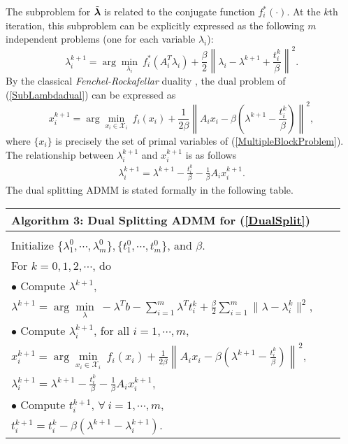 \documentclass{mcom-l}
\theoremstyle{definition}
\theoremstyle{remark}
\numberwithin{equation}{section}
\begin{document}
{The subproblem for $\tilde{{\mbox{\boldmath $\lambda$}}}$ is related to the conjugate function $f_i^*(\cdot)$. At the $k$th iteration, this subproblem can be explicitly expressed as the following $m$ independent problems (one for each variable $\lambda_i$):
\begin{equation}\label{SubLambdadual}
\lambda_i^{k+1} = \arg\min_{\lambda_i}\ f_i^*(A_i^T \lambda_i) +
\frac{\beta}{2}\left\| \lambda_i - \lambda^{k+1} + \frac{t_i^k}{\beta}
\right\|^2.
\end{equation}
By the classical {\em{Fenchel-Rockafellar}} duality \cite{BauschkeCombettes2011,Rockafellar1996},  the dual problem of (\ref{SubLambdadual}) can be expressed as
\begin{equation}\label{SubLambdaprimal}
x_i^{k+1} = \arg\min_{x_i\in {\mathcal{X}}_i}\ f_i(x_i) +
\frac{1}{2\beta}\left\| A_i x_i - \beta (\lambda^{k+1} -
\frac{t_i^k}{\beta}) \right\|^2,
\end{equation}
where $\{x_i\}$ is precisely the set of primal variables of (\ref{MultipleBlockProblem}). The relationship between $\lambda_i^{k+1}$ and $x_i^{k+1}$ is as follows
\begin{align}\label{eqLambda}
\lambda_i^{k+1} = \lambda^{k+1} - \frac{t_i^k}{\beta} - \frac{1}{\beta} A_i x_i^{k+1}.\end{align}
The dual splitting ADMM is stated formally in the following table.
\begin{center}
\begin{tabular}{@{}llr@{}}\toprule
{\bf{\qquad\quad Algorithm 3: Dual Splitting ADMM for (\ref{DualSplit})}}\\
\hline\\
\qquad Initialize $\{\lambda_1^0,\cdots,\lambda_m^0\},\{t_1^0,\cdots,t_m^0\}$, and $\beta$.\\
\qquad For $k = 0,1,2,\cdots $, do\\
\qquad \qquad $\bullet$ Compute $\lambda^{k+1}$,\\
\qquad\qquad\qquad$\lambda^{k+1}= \arg\min\limits_{\lambda}\  - \lambda^T b - \sum\limits_{i=1}^m \lambda^T t_i^k + \frac{\beta}{2}\sum\limits_{i=1}^m \| \lambda - \lambda_i^k \|^2$,\\
\qquad \qquad $\bullet$ Compute $\lambda_i^{k+1}$, for all $i = 1, \cdots,m$,\\
\qquad\qquad\qquad$x_i^{k+1} = \arg\min\limits_{x_i\in {\mathcal{X}}_i}\ f_i(x_i) + \frac{1}{2\beta}\left\| A_i x_i - \beta (\lambda^{k+1} - \frac{t_i^k}{\beta}) \right\|^2,$\\
\qquad\qquad\qquad $\lambda_i^{k+1} = \lambda^{k+1} - \frac{t_i^k}{\beta} - \frac{1}{\beta} A_i x_i^{k+1},$\\
\qquad \qquad $\bullet$ Compute $t_i^{k+1}$, $\forall \ i = 1, \cdots,m$,\\
\qquad\qquad\qquad$t_i^{k+1} = t_i^k - \beta (\lambda^{k+1} - \lambda_i^{k+1})$.\\
\hline
\end{tabular}
\end{center}

}
\end{document}
